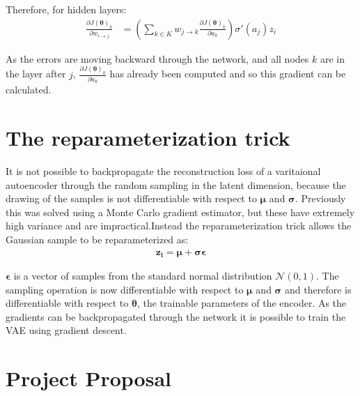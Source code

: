 \documentclass[12pt,a4paper,twoside,openright]{report}
\renewcommand{\vec}[1]{\bm{#1}}
\begin{document}
Therefore, for hidden layers:
\begin{align}
  \frac{\partial J(\vec{\theta})_k}{\partial w_{i \to j}} & = \left( \sum_{k \in K} w_{j \to k} \frac{\partial J(\vec{\theta})_k}{\partial a_k} \right) \sigma'(a_j) z_i
\end{align}

As the errors are moving backward through the network, and all nodes $k$ are in the layer after $j$, $\frac{\partial J(\vec{\theta})_k}{\partial a_k}$
has already been computed and so this gradient can be calculated.

\chapter{The reparameterization trick} \label{reparam}

It is not possible to backpropagate the reconstruction loss of a varitaional autoencoder through the random sampling in the latent dimension, because the drawing of
the samples is not differentiable with respect to $\vec{\mu}$ and $\vec{\sigma}$. Previously this was solved using a Monte Carlo gradient estimator, but these have 
extremely high variance and are impractical.Instead the reparameterization trick allows the Gaussian sample to be reparameterized as:
\begin{align}
  \vec{z_{i}} = \vec{\mu} + \vec{\sigma}\vec{\epsilon}
\end{align}

$\vec{\epsilon}$ is a vector of samples from the standard normal distribution $\mathcal{N}(0, 1)$. The sampling operation is now differentiable
with respect to $\vec{\mu}$ and $\vec{\sigma}$ and therefore is differentiable with respect to $\vec{\theta}$, the trainable parameters of the encoder. As the
gradients can be backpropagated through the network it is possible to train the VAE using gradient descent.

\chapter{Project Proposal} \label{proposal}

\end{document}
